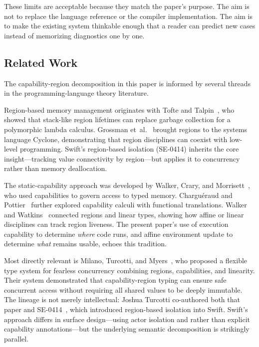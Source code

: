 These limits are acceptable because they match the paper's purpose. The aim is not to replace the language reference or the compiler implementation. The aim is to make the existing system thinkable enough that a reader can predict new cases instead of memorizing diagnostics one by one.

\subsection{Related Work}

The capability-region decomposition in this paper is informed by several threads in the programming-language theory literature.

Region-based memory management originates with Tofte and Talpin~\cite{tofte1997region}, who showed that stack-like region lifetimes can replace garbage collection for a polymorphic lambda calculus. Grossman et~al.~\cite{grossman2002cyclone} brought regions to the systems language Cyclone, demonstrating that region disciplines can coexist with low-level programming. Swift's region-based isolation (SE-0414) inherits the core insight—tracking value connectivity by region—but applies it to concurrency rather than memory deallocation.

The static-capability approach was developed by Walker, Crary, and Morrisett~\cite{walker2000capabilities}, who used capabilities to govern access to typed memory. Chargu\'{e}raud and Pottier~\cite{chargueraud2008capabilities} further explored capability calculi with functional translations. Walker and Watkins~\cite{walker2001regions} connected regions and linear types, showing how affine or linear disciplines can track region liveness. The present paper's use of execution capability to determine \emph{where} code runs, and affine environment update to determine \emph{what} remains usable, echoes this tradition.

Most directly relevant is Milano, Turcotti, and Myers~\cite{milano2022fearless}, who proposed a flexible type system for fearless concurrency combining regions, capabilities, and linearity. Their system demonstrated that capability-region typing can ensure safe concurrent access without requiring all shared values to be deeply immutable. The lineage is not merely intellectual: Joshua Turcotti co-authored both that paper and SE-0414~\cite{se0414}, which introduced region-based isolation into Swift. Swift's approach differs in surface design—using actor isolation and  rather than explicit capability annotations—but the underlying semantic decomposition is strikingly parallel.

